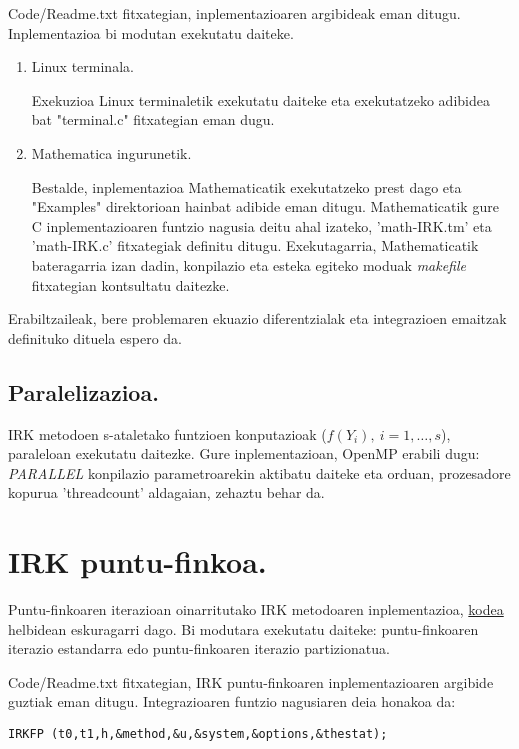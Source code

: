 Code/Readme.txt fitxategian, inplementazioaren argibideak eman ditugu. Inplementazioa bi modutan exekutatu daiteke.

\begin{enumerate}
\item Linux terminala.

Exekuzioa Linux terminaletik exekutatu daiteke eta exekutatzeko adibidea bat  "terminal.c" fitxategian eman dugu. 

\item Mathematica ingurunetik.

Bestalde, inplementazioa Mathematicatik exekutatzeko prest dago eta "Examples" direktorioan hainbat adibide eman ditugu. Mathematicatik gure C inplementazioaren funtzio nagusia deitu ahal izateko, 'math-IRK.tm' eta 'math-IRK.c' fitxategiak definitu ditugu. Exekutagarria, Mathematicatik bateragarria izan dadin, konpilazio eta esteka egiteko moduak \emph{makefile} fitxategian kontsultatu daitezke.    

\end{enumerate}

Erabiltzaileak, bere problemaren ekuazio diferentzialak eta integrazioen emaitzak definituko dituela espero da. 

\subsection*{Paralelizazioa.}

IRK metodoen s-ataletako funtzioen konputazioak ($f(Y_i), \ i=1,\dots,s$), paraleloan exekutatu daitezke. Gure inplementazioan, OpenMP erabili dugu:  \emph{PARALLEL} konpilazio parametroarekin aktibatu daiteke eta orduan, prozesadore kopurua 'threadcount' aldagaian, zehaztu behar da. 


\section{IRK puntu-finkoa.}

Puntu-finkoaren iterazioan oinarritutako IRK metodoaren inplementazioa, \href{https://github.com/mikelehu/IRK-FixedPoint}{kodea} helbidean eskuragarri dago. Bi modutara exekutatu daiteke: puntu-finkoaren iterazio estandarra edo puntu-finkoaren iterazio partizionatua. 

Code/Readme.txt fitxategian, IRK puntu-finkoaren inplementazioaren argibide guztiak eman ditugu. Integrazioaren funtzio nagusiaren deia honakoa da:   
\begin{lstlisting}
IRKFP (t0,t1,h,&method,&u,&system,&options,&thestat);
\end{lstlisting}

